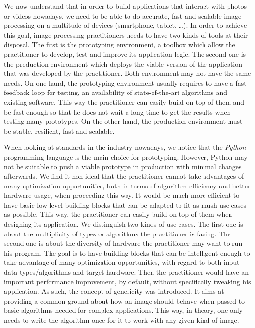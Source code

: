 We now understand that in order to build applications that interact with photos or videos nowadays, we need to be able
to do accurate, fast and scalable image processing on a multitude of devices (smartphone, tablet, \ldots). In order to
achieve this goal, image processing practitioners needs to have two kinds of tools at their disposal. The first is the
prototyping environment, a toolbox which allow the practitioner to develop, test and improve its application logic. The
second one is the production environment which deploys the viable version of the application that was developed by the
practitioner. Both environment may not have the same needs. On one hand, the prototyping environment usually requires to
have a fast feedback loop for testing, an availability of state-of-the-art algorithms and existing software. This way
the practitioner can easily build on top of them and be fast enough so that he does not wait a long time to get the
results when testing many prototypes. On the other hand, the production environment must be stable, resilient, fast and
scalable.

When looking at standards in the industry nowadays, we notice that the \emph{Python} programming language is the main
choice for prototyping. However, Python may not be suitable to push a viable prototype in production with minimal
changes afterwards. We find it non-ideal that the practitioner cannot take advantages of many optimization
opportunities, both in terms of algorithm efficiency and better hardware usage, when proceeding this way. It would be
much more efficient to have basic low level building blocks that can be adapted to fit as mush use cases as possible.
This way, the practitioner can easily build on top of them when designing its application. We distinguish two kinds of
use cases. The first one is about the multiplicity of types or algorithms the practitioner is facing. The second one is
about the diversity of hardware the practitioner may want to run his program. The goal is to have building blocks that
can be intelligent enough to take advantage of many optimization opportunities, with regard to both input data
types/algorithms and target hardware. Then the practitioner would have an important performance improvement, by default,
without specifically tweaking his application. As such, the concept of genericity was introduced. It aims at providing a
common ground about how an image should behave when passed to basic algorithms needed for complex applications. This
way, in theory, one only needs to write the algorithm once for it to work with any given kind of image.


